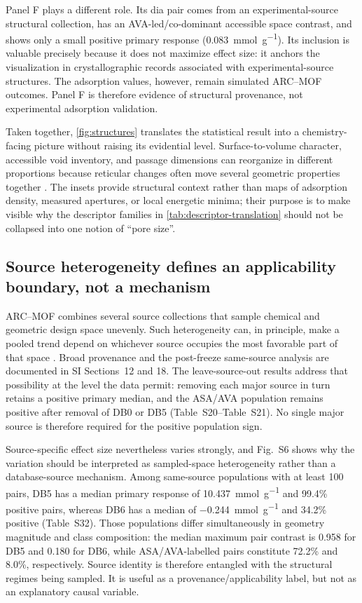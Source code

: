\documentclass[11pt,a4paper]{article}
\newcommand{\SIfig}[1]{Fig.~S#1}
\newcommand{\SItab}[1]{Table~S#1}
\newcommand{\SIsecs}[1]{SI Sections~#1}
\begin{document}
Panel F plays a different role. Its dia pair comes from an
experimental-source structural collection, has an AVA-led/co-dominant accessible
space contrast, and shows only a small positive primary response
(\SI{0.083}{\milli\mole\per\gram}). Its inclusion is valuable precisely because it
does not maximize effect size: it anchors the visualization in crystallographic
records associated with experimental-source structures. The adsorption values,
however, remain simulated ARC--MOF outcomes. Panel F is therefore evidence of
structural provenance, not experimental adsorption validation.

Taken together, \cref{fig:structures} translates the statistical result into a
chemistry-facing picture without raising its evidential level. Surface-to-volume
character, accessible void inventory, and passage dimensions can reorganize in
different proportions because reticular changes often move several geometric
properties together \cite{furukawa2013chemistry,ji2020porechemistry}. The insets
provide structural context rather than maps of adsorption density, measured
apertures, or local energetic minima; their purpose is to make visible why the
descriptor families in \cref{tab:descriptor-translation} should not be collapsed
into one notion of ``pore size''.


\subsection{Source heterogeneity defines an applicability boundary, not a mechanism}

ARC--MOF combines several source collections that sample chemical and geometric
design space unevenly. Such heterogeneity can, in principle, make a pooled trend
depend on whichever source occupies the most favorable part of that space
\cite{chung2014core,moosavi2020ecosystem}. Broad provenance and the post-freeze
same-source analysis are documented in \SIsecs{12 and 18}. The leave-source-out results address
that possibility at the level the data permit: removing each major source in turn
retains a positive primary median, and the ASA/AVA population remains positive
after removal of DB0 or DB5 (\SItab{20}--\SItab{21}). No single major source is
therefore required for the positive population sign.

Source-specific effect size nevertheless varies strongly, and \SIfig{6} shows why
the variation should be interpreted as sampled-space heterogeneity rather than a
database-source mechanism. Among same-source populations with at least 100 pairs,
DB5 has a median primary response of
\SI{10.437}{\milli\mole\per\gram} and 99.4\% positive pairs, whereas DB6 has a
median of \SI{-0.244}{\milli\mole\per\gram} and 34.2\% positive
(\SItab{32}). Those populations differ simultaneously in geometry magnitude and
class composition: the median maximum pair contrast is 0.958 for DB5 and 0.180 for
DB6, while ASA/AVA-labelled pairs constitute 72.2\% and 8.0\%, respectively.
Source identity is therefore entangled with the structural regimes being sampled.
It is useful as a provenance/applicability label, but not as an explanatory causal
variable.
\end{document}
